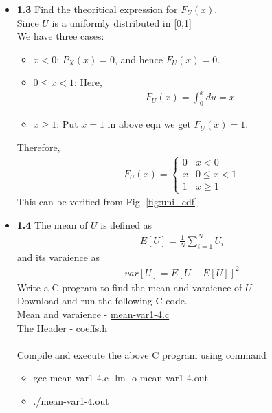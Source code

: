 \documentclass[journal,12pt,twocolumn]{IEEEtran}
\begin{document}
\begin{itemize}
    \item \textbf{1.3} Find the theoritical expression for $F_U(x)$. \\
    \solution Since $U$ is a uniformly distributed in [0,1]  \\
    We have three cases:
	\begin{itemize}
	\item $x < 0$: $P_X(x) = 0$, and hence $F_U(x) = 0$.
	\item $0 \leq x < 1$: Here,
	\begin{align}
        F_U(x) = \int_{0}^{x}du = x
	\end{align}
	\item $x \geq 1$: Put $x = 1$ in above eqn we get $F_U(x) = 1$.
	\end{itemize}
Therefore,
    \begin{align}
		F_U(x) = 
		\begin{cases}
			0 & x < 0 \\
			x & 0 \leq x < 1 \\
			1 & x \geq 1
		\end{cases}
    \end{align}
This can be verified from Fig. \ref{fig:uni_cdf} \\
    
    \item \textbf{1.4} The mean of $U$ is defined as 
    \begin{align}
        E[U] = \frac{1}{N} \sum_{i=1}^N U_i
    \end{align}
    and its varaience as 
    \begin{align}
        var[U] = E[U - E[U]]^2
    \end{align}
    Write a C program to find the mean and varaience of $U$ \\
    
    \solution Download and run the following C code.\\
    Mean and varaience - \href{https://github.com/jarpula-Bhanu/Random-numbers/blob/main/codes/mean-var1-4.c}{mean-var1-4.c}\\
    The Header - \href{https://github.com/jarpula-Bhanu/Random-numbers/blob/main/codes/coeffs.h}{coeffs.h} \\
    \\Compile and execute the above C program using command
    \begin{itemize}
        \item gcc mean-var1-4.c -lm -o mean-var1-4.out
        \item ./mean-var1-4.out \\
    \end{itemize}


\end{itemize}
\end{document}
